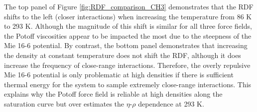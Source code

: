 \documentclass[preprint,review,12pt]{elsarticle}
\begin{document}
	The top panel of Figure \ref{fig:RDF_comparison_CH3} demonstrates that the RDF shifts to the left (closer interactions) when increasing the temperature from 86 K to 293 K. Although the magnitude of this shift is similar for all three force fields, the Potoff viscosities appear to be impacted the most due to the steepness of the Mie 16-6 potential. By contrast, the bottom panel demonstrates that increasing the density at constant temperature does not shift the RDF, although it does increase the frequency of close-range interactions. Therefore, the overly repulsive Mie 16-6 potential is only problematic at high densities if there is sufficient thermal energy for the system to sample extremely close-range interactions. This explains why the Potoff force field is reliable at high densities along the saturation curve but over estimates the $\eta$-$\rho$ dependence at 293 K.	
	
	
	
%	
\end{document}
